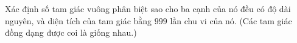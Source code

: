\ifshowproblem
\begin{problem}\label{example:CHN-2015-GMO-P5}
    Xác định số tam giác vuông phân biệt sao cho ba cạnh của nó đều có độ dài nguyên, và diện tích của tam giác bằng $999$ lần chu vi của nó.  
(Các tam giác đồng dạng được coi là giống nhau.)
\end{problem}
\fi

\footnotemark
{}
\fi